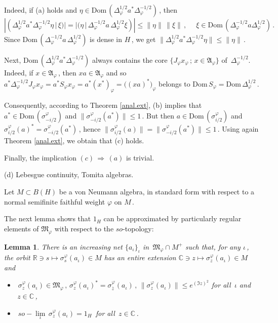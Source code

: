 \documentclass[reqno]{amsart}
\newtheorem{lemma}[theorem]{Lemma}
\theoremstyle{definition}
\theoremstyle{remark}
\numberwithin{equation}{section}
\theoremstyle{plain}
\begin{document}
Indeed, if (a) holds and $\eta\in\text{Dom}\, (\Delta_\varphi^{1/2}
a^*\Delta_\varphi^{-1/2})\,$, then
\begin{equation*}
|(\Delta_\varphi^{1/2} a^*\Delta_\varphi^{-1/2}\eta\, |\,\xi )|=
|(\eta\, |\,\Delta_\varphi^{-1/2} a\,\Delta_\varphi^{1/2}\xi )|\leq
\|\eta\|\,\|\xi\|\, ,\quad\; \xi\in
\text{Dom}\, (\Delta_\varphi^{-1/2} a\Delta_\varphi^{1/2})\, .
\end{equation*}
Since $\text{Dom}\, (\Delta_\varphi^{-1/2} a\,\Delta_\varphi^{1/2})$
is dense in $H\,$, we get $\|\Delta_\varphi^{1/2} a^*
\Delta_\varphi^{-1/2}\eta\|\leq\|\eta\|\,$.

Next, $\text{Dom}\, (\Delta_\varphi^{1/2}a^*\Delta_\varphi^{-1/2})$
always contains the core $\{ J_\varphi x_\varphi\, ;\, x\in
\mathfrak A_\varphi \}$ of $\,\Delta_\varphi^{-1/2}$. Indeed, if
$x\in\mathfrak A_\varphi\,$, then $xa\in\mathfrak A_\varphi$ and
so $a^*\Delta_\varphi^{-1/2}
J_\varphi x_\varphi =a^* S_\varphi x_\varphi =a^* (x^*)_\varphi
=\big( (x a)^*\big)_\varphi$ belongs to $\text{Dom}\, S_\varphi
=\text{Dom}\,\Delta_\varphi^{1/2}\,$.

Consequently, according to Theorem \ref{anal.ext}, (b) implies
that $a^*\in\text{Dom}\, (\sigma^\varphi_{-i/2})$ and
$\|\sigma^\varphi_{-i/2}(a^*)\|\leq 1\,$. But then $a\in
\text{Dom}\, (\sigma^\varphi_{i/2})$ and $\sigma^\varphi_{i/2}
(a)^* =\sigma^\varphi_{-i/2}(a^*)\,$, hence
$\|\sigma^\varphi_{i/2} (a)\| =\|\sigma^\varphi_{-i/2}(a^*)\|
\leq 1\,$. Using again Theorem \ref{anal.ext}, we obtain that
(c) holds.

Finally, the implication $(c)\,\Rightarrow\, (a)$ is trivial.

\bigskip
\noindent (d) {\sc Lebesgue continuity, Tomita algebras}.
\bigskip

Let $M\subset B(H)$ be a von Neumann algebra, in standard form with
respect to a normal semifinite faithful weight $\varphi$ on $M\,$.

The next lemma shows that $1_H$ can be approximated by particularly
regular elements of $\mathfrak M_\varphi$ with respect to the
$so$-topology:
\smallskip

\begin{lemma}\label{anal.a.u}
There is an increasing net $\{ a_\iota\}_\iota$ in
$\,\mathfrak M_\varphi\cap M^+$ such that, for any $\iota\,$,
the orbit $\mathbb R\ni s\longmapsto \sigma^\varphi_s (a_\iota )
\in M$ has an entire extension $\mathbb C\ni z\longmapsto
\sigma^\varphi_z (a_\iota )\in M$ and
\begin{itemize}
\item[--] $\;\sigma^\varphi_z (a_\iota )\in\mathfrak M_\varphi\,
,\,\sigma^\varphi_z (a_\iota )^* =\sigma^\varphi_{\overline{z}}
(a_\iota )\, ,\,
\| \sigma^\varphi_z (a_\iota )\|\leq e^{(\Im z)^2}$ for
all $\,\iota$ and $\, z\in\mathbb C\,$,
\item[--] $\; so-\lim\limits_\iota\, \sigma^\varphi_z (a_\iota )
=1_H\,$ for all $\, z\in\mathbb C\,$.
\end{itemize}
\end{lemma}
\smallskip
\end{document}
